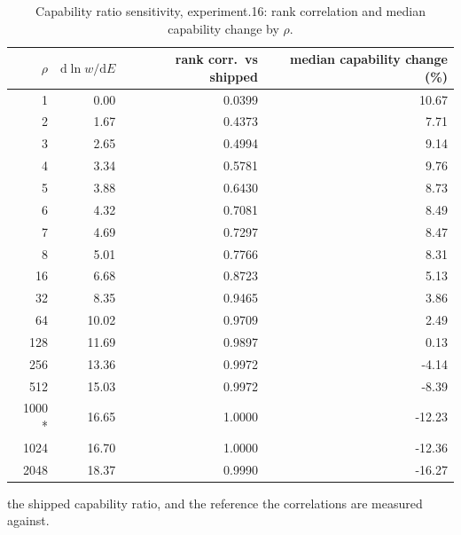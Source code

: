 \begin{table}[htbp]
  \centering
  \caption{Capability ratio sensitivity, experiment.16: rank correlation and median capability change by $\rho$.}
  \label{tab:rho-experiment-16-summary}
  \begin{tabular}{r r r r}
    \toprule
    $\rho$ & $\mathrm{d}\ln w/\mathrm{d}E$ & rank corr.\ vs shipped & median capability change (\%) \\
    \midrule
    1 & 0.00 & 0.0399 & 10.67 \\
    2 & 1.67 & 0.4373 & 7.71 \\
    3 & 2.65 & 0.4994 & 9.14 \\
    4 & 3.34 & 0.5781 & 9.76 \\
    5 & 3.88 & 0.6430 & 8.73 \\
    6 & 4.32 & 0.7081 & 8.49 \\
    7 & 4.69 & 0.7297 & 8.47 \\
    8 & 5.01 & 0.7766 & 8.31 \\
    16 & 6.68 & 0.8723 & 5.13 \\
    32 & 8.35 & 0.9465 & 3.86 \\
    64 & 10.02 & 0.9709 & 2.49 \\
    128 & 11.69 & 0.9897 & 0.13 \\
    256 & 13.36 & 0.9972 & -4.14 \\
    512 & 15.03 & 0.9972 & -8.39 \\
    1000 * & 16.65 & 1.0000 & -12.23 \\
    1024 & 16.70 & 1.0000 & -12.36 \\
    2048 & 18.37 & 0.9990 & -16.27 \\
    \bottomrule
  \end{tabular}
  \par\smallskip\footnotesize * the shipped capability ratio, and the reference the correlations are measured against.
\end{table}
